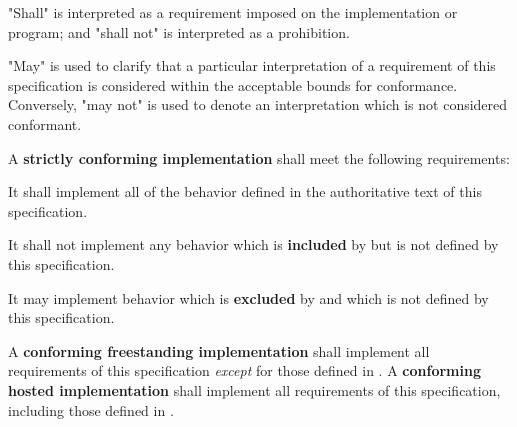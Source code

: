 
\specitem
"Shall" is interpreted as a requirement imposed on the implementation or
program; and "shall not" is interpreted as a prohibition.

\specitem
"May" is used to clarify that a particular interpretation of a requirement of
this specification is considered within the acceptable bounds for conformance.
Conversely, "may not" is used to denote an interpretation which is not
considered conformant.

\specitem
A \textbf{strictly conforming implementation} shall meet the following
requirements:

\specsubitem
It shall implement all of the behavior defined in the authoritative text of this
\\ specification.

\specsubitem
It shall not implement any behavior which is \textbf{included} by
 but is not defined by this specification.


\specsubitem
It may implement behavior which is \textbf{excluded} by  and
which is not defined by this specification.

\specitem
A \textbf{conforming freestanding implementation} shall implement all
requirements of this specification \textit{except} for those defined in
. A \textbf{conforming hosted implementation} shall
implement all requirements of this specification, including those defined in
.


